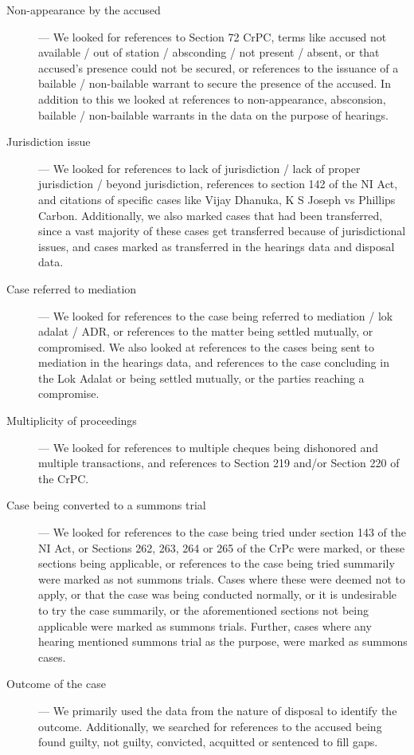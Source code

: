 \begin{description}
\item [Non-appearance by the accused] --- We looked for references to Section 72
  CrPC, terms like accused not available / out of station / absconding
  / not present / absent, or that accused’s presence could not be
  secured, or references to the issuance of a bailable / non-bailable
  warrant to secure the presence of the accused. In addition to this
  we looked at references to non-appearance, absconsion, bailable /
  non-bailable warrants in the data on the purpose of hearings.
\item [Jurisdiction issue] --- We looked for references to lack of
  jurisdiction / lack of proper jurisdiction / beyond jurisdiction,
  references to section 142 of the NI Act, and citations of specific
  cases like Vijay Dhanuka, K S Joseph vs Phillips
  Carbon. Additionally, we also marked cases that had been
  transferred, since a vast majority of these cases get transferred
  because of jurisdictional issues, and cases marked as transferred in
  the hearings data and disposal data.
\item [Case referred to mediation] --- We looked for references to the case being
  referred to mediation / lok adalat / ADR, or references to the
  matter being settled mutually, or compromised. We also looked at
  references to the cases being sent to mediation in the hearings
  data, and references to the case concluding in the Lok Adalat or
  being settled mutually, or the parties reaching a compromise.
\item [Multiplicity of proceedings] --- We looked for references to multiple cheques
  being dishonored and multiple transactions, and references to
  Section 219 and/or Section 220 of the CrPC.
\item [Case being converted to a summons trial] --- We looked for references to the case being
  tried under section 143 of the NI Act, or Sections 262, 263, 264 or
  265 of the CrPc were marked, or these sections being applicable, or
  references to the case being tried summarily were marked as not
  summons trials. Cases where these were deemed not to apply, or that
  the case was being conducted normally, or it is undesirable to try
  the case summarily, or the aforementioned sections not being
  applicable were marked as summons trials. Further, cases where any
  hearing mentioned summons trial as the purpose, were marked as
  summons cases.
\item [Outcome of the case] --- We primarily used the data from the nature of
  disposal to identify the outcome. Additionally, we searched for
  references to the accused being found guilty, not guilty, convicted,
  acquitted or sentenced to fill gaps.
\end{description}


